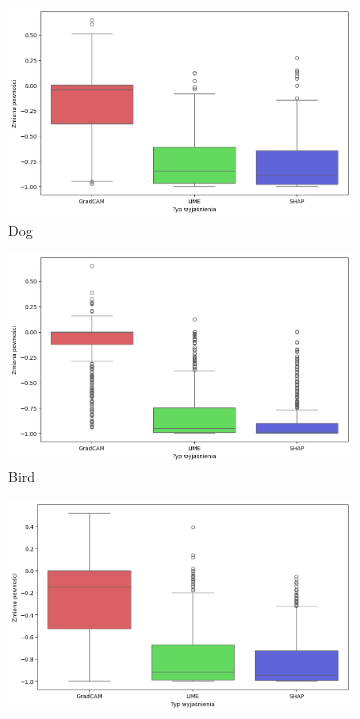 \begin{figure}[h]
	\centering
	\begin{subfigure}[b]{0.3\textwidth}
		\includegraphics[width=.9\textwidth]{img/base_confidence_exp_dog}
		\caption{Dog}  \label{rys:base_confidence_exp_dog}
	\end{subfigure}
	\begin{subfigure}[b]{0.3\textwidth}
		\centering\includegraphics[width=.9\textwidth]{img/base_confidence_exp_bird}
		\caption{Bird}  \label{rys:base_confidence_exp_bird}
	\end{subfigure}
	\begin{subfigure}[b]{0.3\textwidth}
		\centering\includegraphics[width=.9\textwidth]{img/base_confidence_exp_vehicle}

\end{subfigure}
\end{figure}
